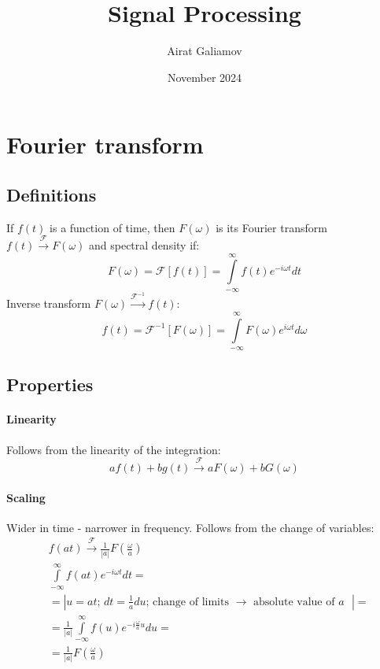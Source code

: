 \documentclass{article}
\title{Signal Processing}
\author{Airat Galiamov}
\date{November 2024}
\begin{document}
\maketitle

\section{Fourier transform}
\subsection{Definitions}
If $f(t)$ is a function of time, then $F(\omega)$ is its Fourier transform $f(t) \xrightarrow {\mathcal{F}} F(\omega)$ and spectral density if:
\begin{equation*}
    F(\omega) = \mathcal{F}[f(t)] = \int \limits^{\infty}_{-\infty} f(t) e^{-i\omega t}dt
\end{equation*}
Inverse transform $F(\omega) \xrightarrow{\mathcal{F}^{-1}} f(t)$:
\begin{equation*}
    f(t) = \mathcal{F}^{-1}[F(\omega)] = \int \limits^{\infty}_{-\infty} F(\omega) e^{i\omega t}d\omega
\end{equation*}

\subsection{Properties}

\paragraph{Linearity} Follows from the linearity of the integration:
\begin{equation*}
    a f(t) + b g(t) \xrightarrow{\mathcal{F}} a F(\omega) + b G(\omega)
\end{equation*}
\paragraph{Scaling} Wider in time - narrower in frequency. Follows from the change of variables:
\begin{align*}
    &f(at) \xrightarrow{\mathcal{F}}  \frac{1}{\left| a \right|} F(\frac{\omega}{a})  \\
    &\int \limits^{\infty}_{-\infty} f(at) e^{-i\omega t}dt = \\
    & = \left| u = at; \, dt = \frac{1}{a}du; \, \text{change of limits $\rightarrow$ absolute value of $a$ }\right| =\\
    & = \frac{1}{\left| a \right|} \int \limits^{\infty}_{-\infty} f(u) e^{-i \frac{\omega}{a} u }du =  \\
    & =\frac{1}{\left| a \right|} F(\frac{\omega}{a})
\end{align*}
\end{document}
